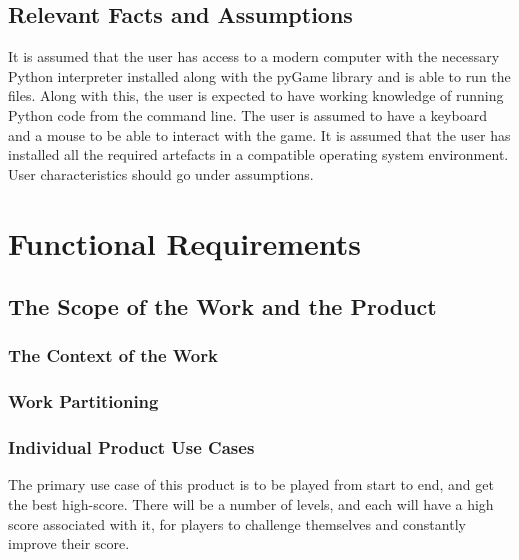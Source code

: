 \documentclass[12pt, titlepage]{article}
\begin{document}
\subsection{Relevant Facts and Assumptions}
    It is assumed that the user has access to a modern computer with the necessary Python interpreter installed along with the pyGame library and is able to run the files. Along with this, the user is expected to have working knowledge of running Python code from the command line. The user is assumed to have a keyboard and a mouse to be able to interact with the game. It is assumed that the user has installed all the required artefacts in a compatible operating system environment.
User characteristics should go under assumptions.

\section{Functional Requirements}

\subsection{The Scope of the Work and the Product}

\subsubsection{The Context of the Work}

\subsubsection{Work Partitioning}

\subsubsection{Individual Product Use Cases}
The primary use case of this product is to be played from start to end, and get the best high-score. There will be a number of levels, and each will have a high score associated with it, for players to challenge themselves and constantly improve their score.
\end{document}
